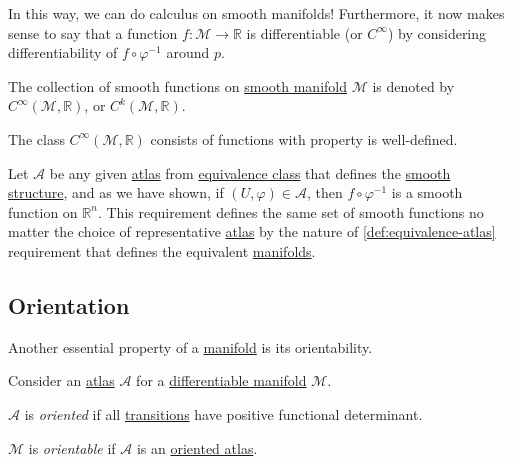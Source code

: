 In this way, we can do calculus on smooth manifolds! Furthermore, it now makes sense to say that a function \(f\colon \mathcal{M} \to \mathbb{R} \) is differentiable (or \(C^{\infty} \)) by considering differentiability of \(f \circ \varphi ^{-1} \) around \(p\).

\begin{notation}
	The collection of smooth functions on \hyperref[def:smooth-manifold]{smooth manifold} \(\mathcal{M} \) is denoted by \(C^{\infty} (\mathcal{M} , \mathbb{R} )\), or \(C^k(\mathcal{M} , \mathbb{R} )\).
\end{notation}

\begin{remark}
	The class \(C^{\infty} (\mathcal{M} , \mathbb{R} )\) consists of functions with property is well-defined.
\end{remark}
\begin{explanation}
	Let \(\mathcal{A} \) be any given \hyperref[def:atlas]{atlas} from \hyperref[def:equivalence-atlas]{equivalence class} that defines the \hyperref[def:smooth-structure]{smooth structure}, and as we have shown, if \((U, \varphi)\in \mathcal{A} \), then \(f \circ \varphi ^{-1} \) is a smooth function on \(\mathbb{R} ^n\). This requirement defines the same set of smooth functions no matter the choice of representative \hyperref[def:atlas]{atlas} by the nature of \autoref{def:equivalence-atlas} requirement that defines the equivalent \hyperref[def:smooth-manifold]{manifolds}.
\end{explanation}

\subsection{Orientation}
Another essential property of a \hyperref[def:topological-manifold]{manifold} is its orientability.

\begin{definition*}
	Consider an \hyperref[def:atlas]{atlas} \(\mathcal{A} \) for a \hyperref[def:smooth-manifold]{differentiable manifold} \(\mathcal{M} \).
	\begin{definition}[Oriented]\label{def:oriented}
		\(\mathcal{A} \) is \emph{oriented} if all \hyperref[def:coordinate-transition]{transitions} have positive functional determinant.
	\end{definition}

	\begin{definition}[Orientable]\label{def:orientable}
		\(\mathcal{M} \) is \emph{orientable} if \(\mathcal{A} \) is an \hyperref[def:oriented]{oriented atlas}.
	\end{definition}
\end{definition*}


